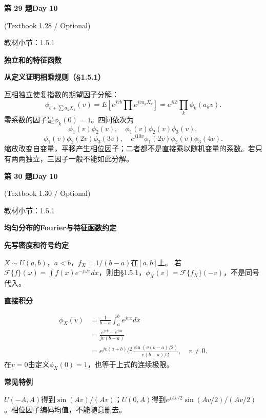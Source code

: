 \documentclass[10.5pt,fontset=fandol]{ctexart}
\newcommand{\key}[1]{\par\vspace{4pt}\noindent\textbf{\color{navy}#1}\par\vspace{2pt}}
\newcommand{\qtitle}[2]{\par\addvspace{1.2em}\Needspace{8\baselineskip}\begin{tcolorbox}[colback=navy,colframe=navy,arc=1.5pt,boxrule=0pt]\color{white}\large\bfseries #1\hfill\small #2\end{tcolorbox}}
\begin{document}
\qtitle{第 29 题}{Day 10}
{\small\color{accentred}(Textbook 1.28 / Optional)}\par\smallskip
{\small\color{muted}教材小节：1.5.1}\par\medskip
\noindent\textbf{独立和的特征函数}\par\smallskip\begin{tcolorbox}[breakable,colback=qbg,colframe=qbg,boxrule=0pt]\key{从定义证明相乘规则（§1.5.1）}
互相独立使复指数的期望因子分解：
\[\phi_{b+\sum a_kX_k}(v)=E[e^{jvb}\prod e^{jva_kX_k}]=e^{jvb}\prod_k\phi_k(a_kv).\]
零系数的因子是$\phi_k(0)=1$。四问依次为
\[\boxed{\phi_1(v)\phi_2(v)},\quad\boxed{\phi_1(v)\phi_2(v)\phi_3(v)},\]
\[\boxed{\phi_1(v)\phi_2(2v)\phi_3(3v)},\quad\boxed{e^{j10v}\phi_1(2v)\phi_2(v)\phi_3(4v)}.\]
缩放改变自变量，平移产生相位因子；二者都不是直接乘以随机变量的系数。若只有两两独立，三因子一般不能如此分解。
\end{tcolorbox}
\qtitle{第 30 题}{Day 10}
{\small\color{accentred}(Textbook 1.30 / Optional)}\par\smallskip
{\small\color{muted}教材小节：1.5.1}\par\medskip
\noindent\textbf{均匀分布的Fourier与特征函数约定}\par\smallskip\begin{tcolorbox}[breakable,colback=qbg,colframe=qbg,boxrule=0pt]\key{先写密度和符号约定}
$X\sim U(a,b)$，$a<b$，$f_X=1/(b-a)$在$[a,b]$上。
若$\mathcal F\{f\}(\omega)=\int f(x)e^{-j\omega x}dx$，则由§1.5.1，$\phi_X(v)=\mathcal F\{f_X\}(-v)$，不是同号代入。
\key{直接积分}
\[\begin{aligned}\phi_X(v)&=\frac1{b-a}\int_a^b e^{jvx}dx\\&=\frac{e^{jvb}-e^{jva}}{jv(b-a)}\\&=\boxed{e^{jv(a+b)/2}\frac{\sin(v(b-a)/2)}{v(b-a)/2}},\quad v\ne0.\end{aligned}\]
在$v=0$由定义$\phi_X(0)=1$，也等于上式的连续极限。
\key{常见特例}
$U(-A,A)$得到$\sin(Av)/(Av)$；$U(0,A)$得到$e^{jAv/2}\sin(Av/2)/(Av/2)$。相位因子编码均值，不能随意删去。
\end{tcolorbox}
\end{document}
